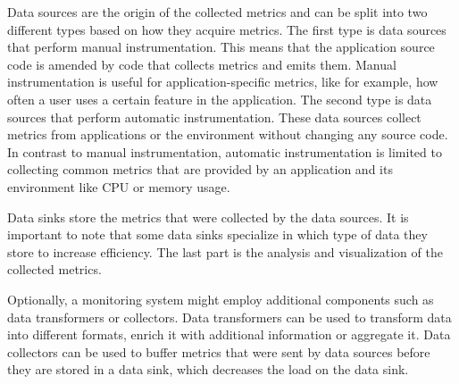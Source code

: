 Data sources are the origin of the collected metrics and can be split into two different types
based on how they acquire metrics. The first type is data sources that perform manual instrumentation.
This means that the application source code is amended by code that collects metrics and emits them.
Manual instrumentation is useful for application-specific metrics, like for example, how often a user
uses a certain feature in the application.
The second type is data sources that perform automatic instrumentation.
These data sources collect metrics from applications or the environment without changing any source code.
In contrast to manual instrumentation, automatic instrumentation is limited to collecting
common metrics that are provided by an application and its environment like CPU or memory usage.

Data sinks store the metrics that were collected by the data sources.
It is important to note that some data sinks specialize in which type of data they store
to increase efficiency. The last part is the analysis and visualization of the collected metrics.

Optionally, a monitoring system might employ additional components such as data transformers or collectors.
Data transformers can be used to transform data into different formats, enrich it with additional information
or aggregate it.
Data collectors can be used to buffer metrics that were sent by data sources before they are stored in a data sink,
which decreases the load on the data sink.
